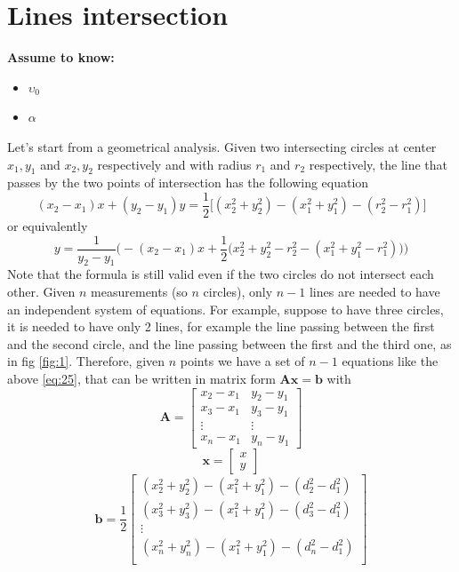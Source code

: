 \documentclass[12pt]{report}
\begin{document}
\section{Lines intersection}
  \begin{center}
  \textbf{Assume to know:}
  \begin{itemize}
    \centering
    \item $\upsilon_0$
    \item $\alpha$
  \end{itemize}
  \end{center}
Let's start from a geometrical analysis. Given two intersecting circles at center $x_{1},y_{1}$ and $x_{2},y_{2}$ respectively and with radius $r_1$ and $r_2$ respectively, the line that passes by the two points of intersection has the following equation \cite{rzk}
\begin{equation}
    (x_2-x_1)x+(y_2-y_1)y=\frac{1}{2}\big[(x_2^2+y_2^2)-(x_1^2+y_1^2)-(r_2^2-r_1^2)\big]
    \label{eq:25}
\end{equation}
or equivalently
\begin{equation}
    y=\frac{1}{y_2-y_1}\bigg(-(x_2-x_1)x+\frac{1}{2}\big(x_2^2+y_2^2-r_2^2-(x_1^2+y_1^2-r_1^2)\big)\bigg)
\end{equation}
Note that the formula is still valid even if the two circles do not intersect each other.
Given $n$ measurements (so $n$ circles), only $n-1$ lines are needed to have an independent system of equations. For example, suppose to have three circles, it is needed to have only 2 lines, for example the line passing between the first and the second circle, and the line passing between the first and the third one, as in fig \ref{fig:1}.
Therefore, given $n$ points we have a set of $n-1$ equations like the above \ref{eq:25}, that can be written in matrix form $\mathbf{Ax}=\mathbf{b}$ with
$$\mathbf{A}=\begin{bmatrix}
x_2-x_1&y_2-y_1\\
x_3-x_1&y_3-y_1\\
\vdots&\vdots\\
x_n-x_1&y_n-y_1
\end{bmatrix}$$
$$\mathbf{x}=\begin{bmatrix}
x\\
y
\end{bmatrix}$$
$$\mathbf{b}=\frac{1}{2}\begin{bmatrix}
(x^2_2+y^2_2)-(x_1^2+y^2_1)-(d_2^2-d_1^2)\\
(x^2_3+y^2_3)-(x_1^2+y^2_1)-(d_3^2-d_1^2)\\
\vdots\\
(x^2_n+y^2_n)-(x_1^2+y^2_1)-(d_n^2-d_1^2)\\
\end{bmatrix}$$
\end{document}
